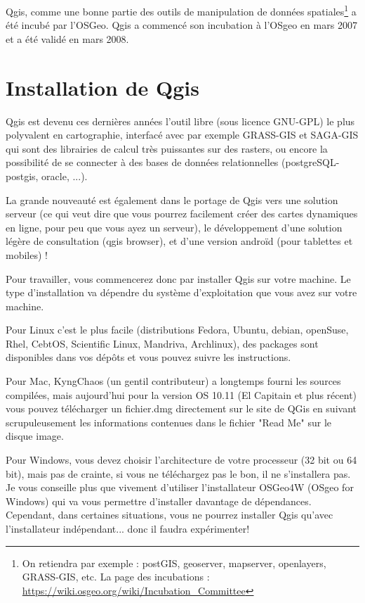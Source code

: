 \documentclass[a4paper, 11pt]{article}
\begin{document}
  Qgis, comme une bonne partie des outils de manipulation de données spatiales\footnote{On retiendra par exemple : postGIS, geoserver, mapserver, openlayers, GRASS-GIS, etc. La page des incubations : \url{https://wiki.osgeo.org/wiki/Incubation_Committee}} a été incubé par l'OSGeo. Qgis a commencé son incubation à l'OSgeo en mars 2007 et a été validé en mars 2008.

\section{Installation de Qgis}
  Qgis est devenu ces dernières années l'outil libre (sous licence GNU-GPL) le plus polyvalent en cartographie, interfacé avec par exemple GRASS-GIS et SAGA-GIS qui sont des librairies de calcul très puissantes sur des rasters, ou encore la possibilité de se connecter à des bases de données relationnelles (postgreSQL-postgis, oracle, ...).

  La grande nouveauté est également dans le portage de Qgis vers une solution serveur (ce qui veut dire que vous pourrez facilement créer des cartes dynamiques en ligne, pour peu que vous ayez un serveur), le développement d'une solution légère de consultation (qgis browser), et d'une version androïd (pour tablettes et mobiles) !

  Pour travailler, vous commencerez donc par installer Qgis sur votre machine. Le type d'installation va dépendre du système d'exploitation que vous avez sur votre machine.

  Pour Linux c'est le plus facile (distributions Fedora, Ubuntu, debian, openSuse, Rhel, CebtOS, Scientific Linux, Mandriva, Archlinux), des packages sont disponibles dans vos dépôts et vous pouvez suivre les instructions.

  Pour Mac, KyngChaos (un gentil contributeur) a longtemps fourni les sources compilées, mais aujourd'hui pour la version OS 10.11 (El Capitain et plus récent) vous pouvez télécharger un fichier.dmg directement sur le site de QGis en suivant scrupuleusement les informations contenues dans le fichier "Read Me" sur le disque image.

  Pour Windows, vous devez choisir l'architecture de votre processeur (32 bit ou 64 bit), mais pas de crainte, si vous ne téléchargez pas le bon, il ne s'installera pas. Je vous conseille plus que vivement d'utiliser l'installateur OSGeo4W (OSgeo for Windows) qui va vous permettre d'installer davantage de dépendances. Cependant, dans certaines situations, vous ne pourrez installer Qgis qu'avec l'installateur indépendant... donc il faudra expérimenter!
\end{document}
